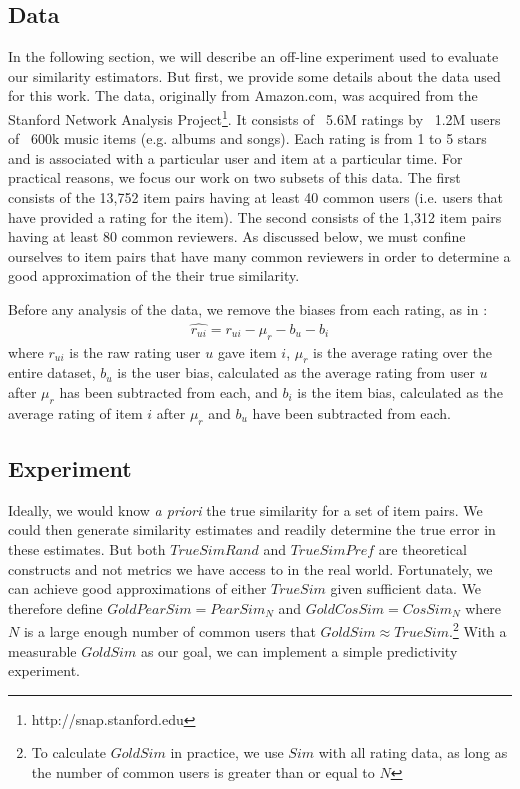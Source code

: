 \documentclass[11pt]{article}
\begin{document}
\subsection*{Data}
In the following section, we will describe an off-line experiment used to
evaluate our similarity estimators. But first, we provide some details about the
data used for this work. The data, originally from Amazon.com, was acquired from
the Stanford Network Analysis Project\footnote{http://snap.stanford.edu}. It
consists of ~5.6M ratings by ~1.2M users of ~600k music items (e.g. albums and
songs). Each rating is from 1 to 5 stars and is associated with a particular
user and item at a particular time.  For practical reasons, we focus our work on
two subsets of this data. The first consists of the 13,752 item pairs having at
least 40 common users (i.e. users that have provided a rating for the item). The
second consists of the 1,312 item pairs having at least 80 common reviewers. As
discussed below, we must confine ourselves to item pairs that have many common
reviewers in order to determine a good approximation of the their true
similarity.

Before any analysis of the data, we remove the biases from each rating, as in
\cite{Koren2009}:
\begin{align}
\hat{r_{ui}} = r_{ui} - \mu_r - b_u - b_i
\end{align}
where $r_{ui}$ is the raw rating user $u$ gave item $i$, $\mu_r$ is the average
rating over the entire dataset, $b_u$ is the user bias, calculated as the
average rating from user $u$ after $\mu_r$ has been subtracted from each, and
$b_i$ is the item bias, calculated as the average rating of item $i$ after
$\mu_r$ and $b_u$ have been subtracted from each. 

\subsection*{Experiment}
Ideally, we would know {\em a priori} the true similarity for a set of item
pairs. We could then generate similarity estimates and readily determine the
true error in these estimates. But both $TrueSimRand$ and $TrueSimPref$ are
theoretical constructs and not metrics we have access to in the real world.
Fortunately, we can achieve good approximations of either $TrueSim$ given
sufficient data. We therefore define $GoldPearSim = PearSim_N$ and $GoldCosSim =
CosSim_N$ where $N$ is a large enough number of common users that $GoldSim 
\approx TrueSim$.\footnote{To calculate $GoldSim$ in practice, we use $Sim$ with
all rating data, as long as the number of common users is greater than or equal
to $N$} With a measurable $GoldSim$ as our goal, we can implement 
a simple predictivity experiment.
\end{document}
